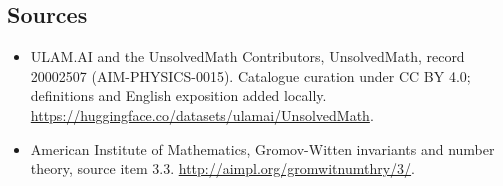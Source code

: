 \documentclass[11pt]{article}
\begin{document}
\subsection{Sources}
\begin{itemize}
\item[\hypertarget{source:20002507:1}{S1}] ULAM.AI and the UnsolvedMath Contributors, UnsolvedMath, record 20002507 (AIM-PHYSICS-0015). Catalogue curation under CC BY 4.0; definitions and English exposition added locally.
\url{https://huggingface.co/datasets/ulamai/UnsolvedMath}.
\item[\hypertarget{source:20002507:2}{S2}] American Institute of Mathematics, Gromov-Witten invariants and number theory, source item 3.3.
\url{http://aimpl.org/gromwitnumthry/3/}.
\end{itemize}
\label{end:20002507}
\end{document}

